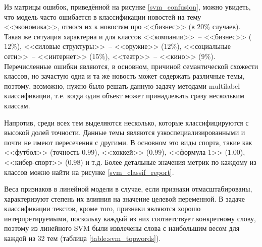 \documentclass[a4paper, 14pt]{extarticle}
\begin{document}
Из матрицы ошибок, приведённой на рисунке \ref{svm_confusion}, можно увидеть, что модель часто ошибается в классификации новостей на тему
<<экономика>>, относя их к новостям про <<бизнес>> (в $20\%$ случаев). Такая же ситуация характерна и для классов <<компании>>~-- 
<<бизнес>> ($12\%$), <<силовые структуры>>~-- <<оружие>> ($12\%$),  <<социальные сети>>~-- <<интернет>> ($15\%$), <<театр>>~-- 
<<кино>> ($9\%$). Перечисленные ошибки являются, в основном, причиной семантической схожести классов, но зачастую одна и та же 
новость может содержать различные темы, поэтому, возможно, нужно было решать данную задачу методами multilabel классификации, т.е. 
когда один объект может принадлежать сразу
нескольким классам.

Напротив, среди всех тем выделяются несколько, которые классифицируются с высокой долей точности. Данные темы 
являются узкоспециализированными и почти не имеют пересечения с другими. В основном это виды спорта, такие как <<футбол>> (точность 
$0.99$), <<хоккей>> ($0.99$), <<формула-1>> ($1.00$), <<кибер-спорт>> ($0.98$) и т.д. Более детальные
значения метрик по каждому из классов можно найти на рисунке \ref{svm_classif_report}.

Веса признаков в линейной модели в случае, если признаки отмасштабированы, характеризуют степень их влияния на значение целевой 
переменной. В задаче классификации текстов, кроме того, признаки являются хорошо интерпретируемыми, поскольку каждый из них 
соответствует конкретному слову, поэтому из линейного SVM были извлечены слова с наибольшим весом для каждой из 32 тем (таблица \ref{table:svm_topwords}). 
%
%
%
%
%
%
%
%
\end{document}
